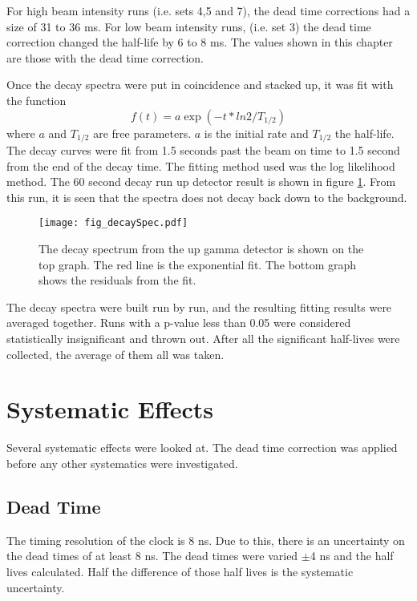 \documentclass[MaxHughesThesis.tex]{subfiles}
\begin{document}
For high beam intensity runs (i.e. sets 4,5 and 7), the dead time corrections had a size of 31 to 36 ms.
For low beam intensity runs, (i.e. set 3) the dead time correction changed the half-life by 6 to 8 ms. 
The values shown in this chapter are those with the dead time correction.

Once the decay spectra were put in coincidence and stacked up, it was fit with the function
%
\begin{equation}
	f(t) = a\exp{(-t*ln2/T_{1/2})}
	\label{eq:fit-function}
\end{equation}
%
where $a$ and $T_{1/2}$ are free parameters.
$a$ is the initial rate and $T_{1/2}$ the half-life.
The decay curves were fit from 1.5 seconds past the beam on time to 1.5 second from the end of the decay time. 
The fitting method used was the log likelihood method. 
The 60 second decay run up detector result is shown in figure \ref{fig:60secdecay}.
From this run, it is seen that the spectra does not decay back down to the background. 

\begin{figure}[!htb]
\centerline{\texttt{[image: fig\_decaySpec.pdf]}}
\caption{The decay spectrum from the up gamma detector is shown on the top graph.
	The red line is the exponential fit. 
	The bottom graph shows the residuals from the fit. 
	}
\label{fig:60secdecay}
\end{figure}


The decay spectra were built run by run, and the resulting fitting results were averaged together. 
Runs with a p-value less than 0.05 were considered statistically insignificant and thrown out.
After all the significant half-lives were collected, the average of them all was taken.

\section{Systematic Effects}
Several systematic effects were looked at.
The dead time correction was applied before any other systematics were investigated. 

\subsection{Dead Time}
The timing resolution of the clock is 8 ns.
Due to this, there is an uncertainty on the dead times of at least 8 ns.
The dead times were varied $\pm$4 ns and the half lives calculated.
Half the difference of those half lives is the systematic uncertainty.
\end{document}
